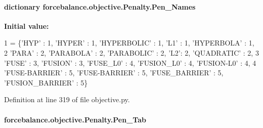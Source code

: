 \hypertarget{classforcebalance_1_1objective_1_1Penalty_a0565dc1b08520f13edc984c14aa7ceb8}{
\paragraph[{Pen\-\_\-\-Names}]{\setlength{\rightskip}{0pt plus 5cm}dictionary forcebalance.\-objective.\-Penalty.\-Pen\-\_\-\-Names\hspace{0.3cm}{\ttfamily [static]}}}\label{classforcebalance_1_1objective_1_1Penalty_a0565dc1b08520f13edc984c14aa7ceb8}
{\bfseries Initial value\-:}
\begin{DoxyCode}
1 = \{\textcolor{stringliteral}{'HYP'} : 1, \textcolor{stringliteral}{'HYPER'} : 1, \textcolor{stringliteral}{'HYPERBOLIC'} : 1, \textcolor{stringliteral}{'L1'} : 1, \textcolor{stringliteral}{'HYPERBOLA'} : 1,
2                       \textcolor{stringliteral}{'PARA'} : 2, \textcolor{stringliteral}{'PARABOLA'} : 2, \textcolor{stringliteral}{'PARABOLIC'} : 2, \textcolor{stringliteral}{'L2'}: 2, \textcolor{stringliteral}{'QUADRATIC'} : 2,
3                       \textcolor{stringliteral}{'FUSE'} : 3, \textcolor{stringliteral}{'FUSION'} : 3, \textcolor{stringliteral}{'FUSE\_L0'} : 4, \textcolor{stringliteral}{'FUSION\_L0'} : 4, \textcolor{stringliteral}{'FUSION-L0'} : 4,
4                       \textcolor{stringliteral}{'FUSE-BARRIER'} : 5, \textcolor{stringliteral}{'FUSE-BARRIER'} : 5, \textcolor{stringliteral}{'FUSE\_BARRIER'} : 5, \textcolor{stringliteral}{'FUSION\_BARRIER'} : 5\}
\end{DoxyCode}


Definition at line 319 of file objective.\-py.

\hypertarget{classforcebalance_1_1objective_1_1Penalty_a22bcc263d510e34d694faa9a70372a03}{
\paragraph[{Pen\-\_\-\-Tab}]{\setlength{\rightskip}{0pt plus 5cm}forcebalance.\-objective.\-Penalty.\-Pen\-\_\-\-Tab}}\label{classforcebalance_1_1objective_1_1Penalty_a22bcc263d510e34d694faa9a70372a03}


